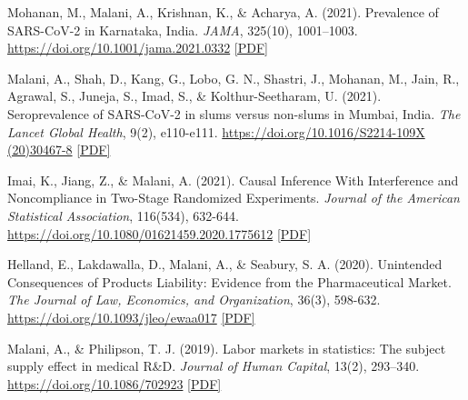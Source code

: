 \begin{tablist}
        \item[2021] \tab{}Mohanan, M., Malani, A., Krishnan, K., \& Acharya, A. (2021). Prevalence of SARS-CoV-2 in Karnataka, India. \textit{JAMA}, 325(10), 1001–1003. \href{https://doi.org/10.1001/jama.2021.0332}{https://doi.org/10.1001/jama.2021.0332} \href{https://github.com/anup-malani/website_personal/blob/main/publications/2021_MohananMalani_JAMA_COVIDKarnatakaSero.pdf}{[PDF]}
        
        \item[2021] \tab{}Malani, A., Shah, D., Kang, G., Lobo, G. N., Shastri, J., Mohanan, M., Jain, R., Agrawal, S., Juneja, S., Imad, S., \& Kolthur-Seetharam, U. (2021). Seroprevalence of SARS-CoV-2 in slums versus non-slums in Mumbai, India. \textit{The Lancet Global Health}, 9(2), e110-e111. \href{https://doi.org/10.1016/S2214-109X(20)30467-8}{https://doi.org/10.1016/S2214-109X (20)30467-8} \href{https://github.com/anup-malani/website_personal/blob/main/publications/2021_MalaniEtAl_LancetGH_SeroMumbaiSlums.pdf}{[PDF]}
        
        \item[2021] \tab{}Imai, K., Jiang, Z., \& Malani, A. (2021). Causal Inference With Interference and Noncompliance in Two-Stage Randomized Experiments. \textit{Journal of the American Statistical Association}, 116(534), 632-644. \href{https://doi.org/10.1080/01621459.2020.1775612}{https://doi.org/10.1080/01621459.2020.1775612} \href{https://github.com/anup-malani/website_personal/blob/main/publications/2021_ImaiMalaniJiang_JASA_TwoStageExperiments.pdf}{[PDF]}

        \item[2020] \tab{}Helland, E., Lakdawalla, D., Malani, A., \& Seabury, S. A. (2020). Unintended Consequences of Products Liability: Evidence from the Pharmaceutical Market. \textit{The Journal of Law, Economics, and Organization}, 36(3), 598-632. \href{https://doi.org/10.1093/jleo/ewaa017}{https://doi.org/10.1093/jleo/ewaa017} \href{https://github.com/anup-malani/website_personal/blob/main/publications/2020_HellandMalaniEtAl_JLEO_PharmaProductsLiability.pdf}{[PDF]} 
        
        \item[2019] \tab{}Malani, A., \& Philipson, T. J. (2019). Labor markets in statistics: The subject supply effect in medical R\&D. \textit{Journal of Human Capital}, 13(2), 293–340. \href{https://doi.org/10.1086/702923}{https://doi.org/10.1086/702923} \href{https://github.com/anup-malani/website_personal/blob/main/publications/2019_MalaniPhilipson_JHC_TrialSubjectMarket.pdf}{[PDF]}
        

\end{tablist}
